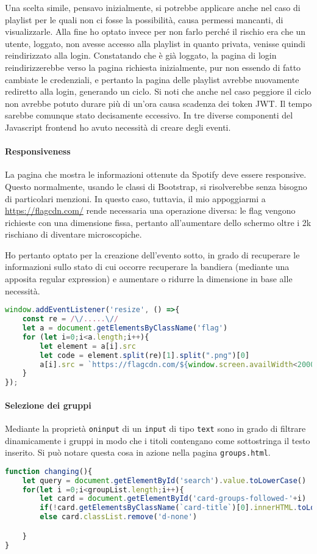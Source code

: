 Una scelta simile, pensavo inizialmente, si potrebbe applicare anche nel caso di playlist per le quali non ci fosse la possibilità, causa permessi mancanti, di visualizzarle. Alla fine ho optato invece per non farlo perché il rischio era che un utente, loggato, non avesse accesso alla playlist in quanto privata, venisse quindi reindirizzato alla login. Constatando che è già loggato, la pagina di login reindirizzerebbe verso la pagina richiesta inizialmente, pur non essendo di fatto cambiate le credenziali, e pertanto la pagina delle playlist avrebbe nuovamente rediretto alla login, generando un ciclo.
\alert{Si noti che anche nel caso peggiore il ciclo non avrebbe potuto durare più di un'ora causa scadenza dei token JWT. Il tempo sarebbe comunque stato decisamente eccessivo.}
In tre diverse componenti del Javascript frontend ho avuto necessità di creare degli eventi.
\paragraph{Responsiveness} La pagina che mostra le informazioni ottenute da Spotify deve essere responsive. Questo normalmente, usando le classi di Bootstrap, si risolverebbe senza bisogno di particolari menzioni. In questo caso, tuttavia, il mio appoggiarmi a \href{https://flagcdn.com/}{https://flagcdn.com/} rende necessaria una operazione diversa: le flag vengono richieste con una dimensione fissa, pertanto all'aumentare dello schermo oltre i 2k rischiano di diventare microscopiche.

Ho pertanto optato per la creazione dell'evento sotto, in grado di recuperare le informazioni sullo stato di cui occorre recuperare la bandiera (mediante una apposita regular expression) e aumentare o ridurre la dimensione in base alle necessità.
\begin{lstlisting}[language=JavaScript]
window.addEventListener('resize', () =>{
    const re = /\/.....\//
    let a = document.getElementsByClassName('flag')
    for (let i=0;i<a.length;i++){
        let element = a[i].src
        let code = element.split(re)[1].split(".png")[0]
        a[i].src = `https://flagcdn.com/${window.screen.availWidth<2000?"16x12":"64x48"}/${code}.png`
    }
});
\end{lstlisting}
\paragraph{Selezione dei gruppi} Mediante la proprietà \verb|oninput| di un \verb|input| di tipo \verb|text| sono in grado di filtrare dinamicamente i gruppi in modo che i titoli contengano come sottostringa il testo inserito. Si può notare questa cosa in azione nella pagina \verb|groups.html|.
\begin{lstlisting}[language=JavaScript]
function changing(){
    let query = document.getElementById('search').value.toLowerCase()
    for(let i =0;i<groupList.length;i++){
        let card = document.getElementById('card-groups-followed-'+i)
        if(!card.getElementsByClassName(`card-title`)[0].innerHTML.toLowerCase().includes(query)) card.classList.add('d-none')
        else card.classList.remove('d-none')

    }
}
\end{lstlisting}
